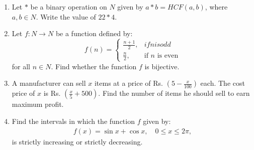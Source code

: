 \begin{enumerate}
    \item Let $*$ be a binary operation on $N$ given by $a * b = HCF(a, b)$, where $a, b \in N$. Write the value of $22 * 4$.
    
    \item Let $f : N \rightarrow N$ be a function defined by:
    \[
    f(n) = 
    \begin{cases} 
    \frac{n+1}{2}, & if  n  is odd  \\ 
    \frac{n}{2}, & \text{if } n \text{ is even}
    \end{cases}
    \]
    for all $n \in N$. Find whether the function $f$ is bijective.
    \item A manufacturer can sell $x$ items at a price of Rs. $\left(5 - \frac{x}{100}\right)$ each. The cost price of $x$ is Rs. $\left(\frac{x}{5} + 500\right)$. Find the number of items he should sell to earn maximum profit.
    
    \item Find the intervals in which the function $f$ given by:
\begin{align}
    f(x) = \sin x + \cos x, \quad 0 \leq x \leq 2\pi,
\end{align}
    is strictly increasing or strictly decreasing.
\end{enumerate}




